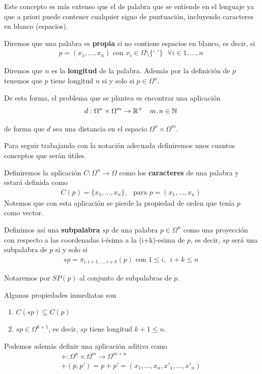 \documentclass[12pt]{article}
\begin{document}
\begin{observacion}
    Este concepto es más extenso que el de palabra que se entiende en el lenguaje ya que a priori puede contener cualquier signo de puntuación, incluyendo caracteres en blanco (espacios).
\end{observacion}

Diremos que una palabra es \textbf{propia} si no contiene espacios en blanco, es decir, si 
\begin{align*}
    p=(x_1,\dots,x_n) \text{ con } x_i\in \Omega \setminus \{\text{` '}\} \ \ \ \forall i\in 1,\dots,n
\end{align*}

Diremos que $n$ es la \textbf{longitud} de la palabra. Además por la definición de $p$ tenemos que $p$ tiene longitud $n$ si y solo si $p\in \Omega^n$.

De esta forma, el problema que se plantea es encontrar una aplicación
\begin{align*}
    d:\Omega^n\times \Omega^m \to \mathbb{R}^+\ \ \ m,n\in \mathbb{N}
\end{align*}

de forma que $d$ sea una distancia en el espacio $\Omega^n\times \Omega^m$.

Para seguir trabajando con la notación adecuada definiremos unos cuantos conceptos que serán útiles.

Definiremos la aplicación $C:\Omega^n\to \Omega$ como los \textbf{caracteres} de una palabra y estará definida como 
\begin{align*}
    C(p)=\{x_1,\dots,x_n\}, \ \ \text{ para } p=(x_1,\dots,x_n)
\end{align*}
Notemos que con esta aplicación se pierde la propiedad de orden que tenía $p$ como vector.

Definimos así una \textbf{subpalabra} $sp$ de una palabra $p\in \Omega^n$ como una proyección con respecto a las coordenadas i-ésima a la (i+k)-esima de $p$, es decir, $sp$ será una subpalabra de $p$ si y solo si 
\begin{align*}
    sp = \pi_{i,i+1,\dots,i+k}(p) \text{ con } 1\leq i,\ \ i+k\leq n
\end{align*}

Notaremos por $SP(p)$ al conjunto de subpalabras de $p$.

Algunas propiedades inmediatas son
\begin{enumerate}
    \item $C(sp)\subseteq C(p)$
    \item $sp \in \Omega^{k+1}$, es decir, $sp$ tiene longitud $k+1 \leq n$.
\end{enumerate}
Podemos además definir una aplicación aditiva como
\begin{align*}
    +:\Omega^n \times \Omega^m \to \Omega^{m+n}\\
    +(p,p')= p + p'=(x_1, \dots, x_n, x'_1, \dots,x'_n)
\end{align*}
\end{document}
